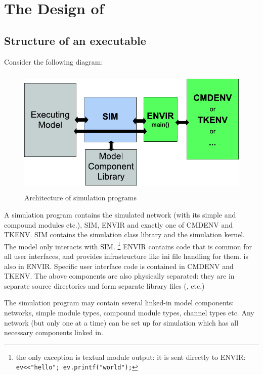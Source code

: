 \chapter{The Design of {\opp}}
\label{cha:the-design-of-omnet}

\section{Structure of an {\opp} executable}

Consider the following diagram:

\begin{figure}[htbp]
  \begin{center}
    \includegraphics[width=4.757in, height=2.412in]{figures/usmanFig18}
    \caption{Architecture of {\opp} simulation programs}
  \end{center}
\end{figure}

A simulation program contains the simulated network (with its
simple and compound
modules etc.), SIM, ENVIR and exactly one of CMDENV and TKENV. SIM
contains the simulation class library
and the simulation kernel. The model only interacts with
SIM.
  \footnote{the only exception is textual module output: it is sent
  directly to ENVIR: \texttt{ev<<"hello"; ev.printf("world");}}
ENVIR contains code that is common for all user
interfaces, and provides infrastructure like ini file handling for
them.  is also in ENVIR. Specific user interface code is
contained in CMDENV and TKENV. The above components are also
physically separated: they are in separate source directories and form
separate library files (,  etc.)

The simulation program may contain several linked-in model
components: networks,
simple module types,
compound module types, channel types etc. Any
network (but only one at a time) can be set up for simulation which
has all necessary components linked in.





